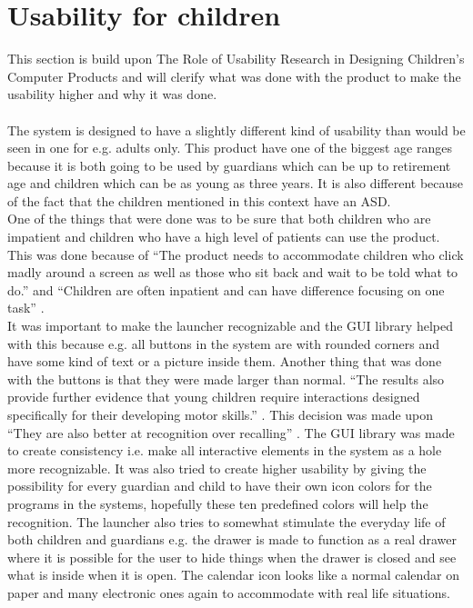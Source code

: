 \section{Usability for children}
\label{Preanalysis:Usability_for_children}
This section is build upon The Role of Usability Research in Designing Children's Computer Products and will clerify what was done with the product to make the usability higher and why it was done.\\\\
The \giraf[] system is designed to have a slightly different kind of usability than would be seen in one for e.g. adults only. This product have one of the biggest age ranges because it is both going to be used by guardians which can be up to retirement age and children which can be as young as three years. It is also different because of the fact that the children mentioned in this context have an ASD.\\
One of the things that were done was to be sure that both children who are impatient and children who have a high level of patients can use the product. This was done because of ``The product needs to accommodate children who click madly around a screen as well as those who sit back and wait to be told what to do.'' \citep{microsoft:usability} and ``Children are often inpatient and can have difference focusing on one task'' \citep{microsoft:usability}.\\
It was important to make the launcher recognizable and the \giraf[] GUI library helped with this because e.g. all buttons in the \giraf[] system are with rounded corners and have some kind of text or a picture inside them. Another thing that was done with the buttons is that they were made larger than normal. ``The results also provide further evidence that young children require interactions designed specifically for their developing motor skills.'' \citep{mousesize}.
This decision was made upon ``They are also better at recognition over recalling'' \citep{microsoft:usability}. The \giraf[] GUI library was made to create consistency i.e. make all interactive elements in the \giraf[] system as a hole more recognizable. It was also tried to create higher usability by giving the possibility for every guardian and child to have their own icon colors for the programs in the \giraf[] systems, hopefully these ten predefined colors will help the recognition. The launcher also tries to somewhat stimulate the everyday life of both children and guardians e.g. the drawer is made to function as a real drawer where it is possible for the user to hide things when the drawer is closed and see what is inside when it is open. The calendar icon looks like a normal calendar on paper and many electronic ones again to accommodate with real life situations. 
